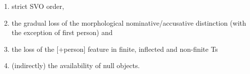 \documentclass[output=paper]{langsci/langscibook}
\begin{document}
\begin{enumerate}
\item strict SVO order, 
\item the gradual loss of the morphological nominative\slash accusative distinction (with the exception of first person) and 
\item the loss of the [+person] feature in finite, inflected  and non-finite Ts
\item (indirectly) the availability of null objects. 
\end{enumerate}

% 
% 
% 
% 
% 
% 
% 
% 
% 
% 
% 
% 
\end{document}
